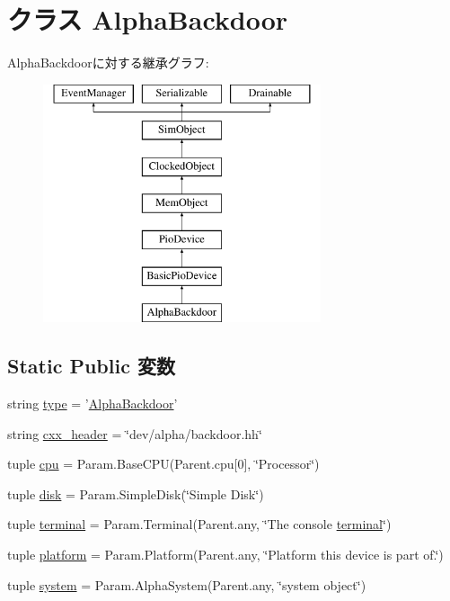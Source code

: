 \hypertarget{classAlphaBackdoor_1_1AlphaBackdoor}{
\section{クラス AlphaBackdoor}
\label{classAlphaBackdoor_1_1AlphaBackdoor}
}
AlphaBackdoorに対する継承グラフ:\begin{figure}[H]
\begin{center}
\leavevmode
\includegraphics[height=7cm]{classAlphaBackdoor_1_1AlphaBackdoor}
\end{center}
\end{figure}
\subsection*{Static Public 変数}
\begin{DoxyCompactItemize}
\item 
string \hyperlink{classAlphaBackdoor_1_1AlphaBackdoor_acce15679d830831b0bbe8ebc2a60b2ca}{type} = '\hyperlink{classAlphaBackdoor_1_1AlphaBackdoor}{AlphaBackdoor}'
\item 
string \hyperlink{classAlphaBackdoor_1_1AlphaBackdoor_a17da7064bc5c518791f0c891eff05fda}{cxx\_\-header} = \char`\"{}dev/alpha/backdoor.hh\char`\"{}
\item 
tuple \hyperlink{classAlphaBackdoor_1_1AlphaBackdoor_a41feb23725c8f280bd96697cc0be1836}{cpu} = Param.BaseCPU(Parent.cpu\mbox{[}0\mbox{]}, \char`\"{}Processor\char`\"{})
\item 
tuple \hyperlink{classAlphaBackdoor_1_1AlphaBackdoor_a2cb8a7cfa320c243ad28a4ba142879c4}{disk} = Param.SimpleDisk(\char`\"{}Simple Disk\char`\"{})
\item 
tuple \hyperlink{classAlphaBackdoor_1_1AlphaBackdoor_a36fbd7aa3e5bc702238c8fc439330d8f}{terminal} = Param.Terminal(Parent.any, \char`\"{}The console \hyperlink{classAlphaBackdoor_ad511a78bad32e194354d8323bc23a4e3}{terminal}\char`\"{})
\item 
tuple \hyperlink{classAlphaBackdoor_1_1AlphaBackdoor_ae6d09ca44893db6cdb66d62deaa1aefd}{platform} = Param.Platform(Parent.any, \char`\"{}Platform this device is part of.\char`\"{})
\item 
tuple \hyperlink{classAlphaBackdoor_1_1AlphaBackdoor_ab737471139f5a296e5b26e8a0e1b0744}{system} = Param.AlphaSystem(Parent.any, \char`\"{}system object\char`\"{})
\end{DoxyCompactItemize}


